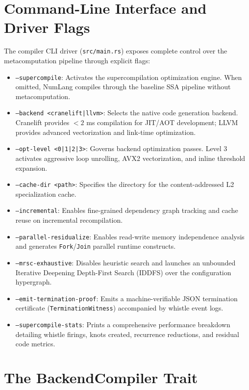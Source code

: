 \section{Command-Line Interface and Driver Flags}
\label{sec:arch:cli}

The compiler CLI driver (\texttt{src/main.rs}) exposes complete control over the metacomputation pipeline through explicit flags:

\begin{itemize}
    \item \texttt{--supercompile}: Activates the supercompilation optimization engine. When omitted, NumLang compiles through the baseline SSA pipeline without metacomputation.
    \item \texttt{--backend <cranelift|llvm>}: Selects the native code generation backend. Cranelift provides $<2$ ms compilation for JIT/AOT development; LLVM provides advanced vectorization and link-time optimization.
    \item \texttt{--opt-level <0|1|2|3>}: Governs backend optimization passes. Level 3 activates aggressive loop unrolling, AVX2 vectorization, and inline threshold expansion.
    \item \texttt{--cache-dir <path>}: Specifies the directory for the content-addressed L2 specialization cache.
    \item \texttt{--incremental}: Enables fine-grained dependency graph tracking and cache reuse on incremental recompilation.
    \item \texttt{--parallel-residualize}: Enables read-write memory independence analysis and generates \texttt{Fork}/\texttt{Join} parallel runtime constructs.
    \item \texttt{--mrsc-exhaustive}: Disables heuristic search and launches an unbounded Iterative Deepening Depth-First Search (IDDFS) over the configuration hypergraph.
    \item \texttt{--emit-termination-proof}: Emits a machine-verifiable JSON termination certificate (\texttt{TerminationWitness}) accompanied by whistle event logs.
    \item \texttt{--supercompile-stats}: Prints a comprehensive performance breakdown detailing whistle firings, knots created, recurrence reductions, and residual code metrics.
\end{itemize}

\section{The BackendCompiler Trait}
\label{sec:arch:backend_trait}

